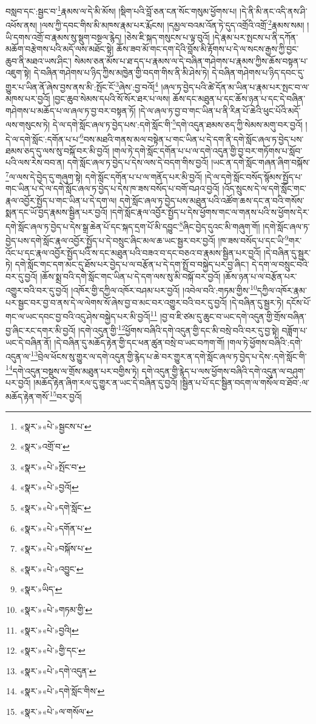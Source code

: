 བསླབ་དང་:སྦྱང་བ་\footnote{«སྣར་»«པེ་»སྦྱངས་པ་}རྣམས་ལ་དེ་མི་མོས། །སྡིག་པའི་བློ་ཅན་ངན་སོང་གསུམ་ཕྱོགས་པ། །དེ་ནི་མི་ནང་འདི་ནས་ཤི་འཕོས་ནས། །ལས་ཀྱི་དབང་གིས་མི་མཁས་རྣམ་པར་རྨོངས། །དམྱལ་བའམ་འོན་ཏེ་དུད་འགྲོའི་འགྲོ་\footnote{«སྣར་»འགྲོ་བ་}རྣམས་སམ། །ཡི་དགས་འགྲོ་བ་རྣམས་སུ་སྡུག་བསྔལ་རྙེད། །ཅེས་ཇི་སྐད་གསུངས་པ་ལྟ་བུའོ། །དེ་རྣམ་པར་སྤངས་པ་ནི་དཀོན་མཆོག་བརྩེགས་པའི་མདོ་ལས་མཐོང་སྟེ། ཆོས་ཟབ་མོ་གང་དག་དེའི་བློས་མི་རྟོགས་པ་དེ་ལ་སངས་རྒྱས་ཀྱི་བྱང་ཆུབ་ནི་མཐའ་ཡས་ཤིང་། སེམས་ཅན་མོས་པ་ཐ་དད་པ་རྣམས་ལ་དེ་བཞིན་གཤེགས་པ་རྣམས་ཀྱིས་ཆོས་བསྟན་པ་འཇུག་སྟེ། དེ་བཞིན་གཤེགས་པ་ཉིད་ཀྱིས་མཁྱེན་གྱི་བདག་གིས་ནི་མི་ཤེས་ཏེ། དེ་བཞིན་གཤེགས་པ་ཉིད་དབང་དུ་གྱུར་པ་ཡིན་ནོ་ཞེས་བྱས་ནས་མི་:སྤོང་ངོ་\footnote{«སྣར་»«པེ་»སྤོང་བ་}ཞེས་:བྱ་བའོ།\footnote{«སྣར་»«པེ་»བྱའོ།} །ཞལ་ཏ་བྱེད་པའི་ཚེ་དོན་མ་ཡིན་པ་རྣམ་པར་སྤང་བ་ལ་མཁས་པར་བྱའོ། །བྱང་ཆུབ་སེམས་དཔའི་སོ་སོར་ཐར་པ་ལས། ཆོས་དང་མཐུན་པ་དང་ཆོས་ཉན་པ་དང་དེ་བཞིན་གཤེགས་པ་མཆོད་པ་ལ་ཞལ་ཏ་བྱ་བར་བསྟན་ཏོ། །དེ་ལ་ཞལ་ཏ་བྱ་བ་གང་ཡིན་པ་ནི་རིན་པོ་ཆེའི་ཕུང་པོའི་མདོ་ལས་གསུངས་ཏེ། དེ་ལ་དགེ་སློང་ཞལ་ཏ་བྱེད་པས་:དགེ་སློང་གི་\footnote{«སྣར་»«པེ་»དགེ་སློང་}དགེ་འདུན་ཐམས་ཅད་ཀྱི་སེམས་མགུ་བར་བྱའོ། །དེ་ལ་དགེ་སློང་:དགོན་པ་པ་\footnote{«སྣར་»«པེ་»དགོན་པ་}བས་མཐའི་གནས་མལ་བསྟེན་པ་གང་ཡིན་པ་དེ་དག་ནི་དགེ་སློང་ཞལ་ཏ་བྱེད་པས་ཐམས་ཅད་དུ་ལས་སུ་བསྐོ་བར་མི་བྱའོ། །གལ་ཏེ་དགེ་སློང་དགོན་པ་པ་ལ་དགེ་འདུན་གྱི་བྱ་བར་གཏོགས་པ་སློབ་པའི་ལས་རེས་བབ་ན། དགེ་སློང་ཞལ་ཏ་བྱེད་པ་དེས་ལས་དེ་བདག་གིས་བྱའོ། །ཡང་ན་དགེ་སློང་གཞན་ཞིག་བསྐོས་\footnote{«སྣར་»«པེ་»བསྐོས་པ་}ལ་ལས་དེ་བྱེད་དུ་གཞུག་སྟེ། དགེ་སློང་དགོན་པ་པ་ལ་གནོད་པར་མི་བྱའོ། །དེ་ལ་དགེ་སློང་བསོད་སྙོམས་སྤྱོད་པ་གང་ཡིན་པ་དེ་ལ་དགེ་སློང་ཞལ་ཏ་བྱེད་པ་དེས་ཁ་ཟས་བསོད་པ་བགོ་བཤའ་བྱའོ། །འོད་སྲུངས་དེ་ལ་དགེ་སློང་གང་རྣལ་འབྱོར་སྤྱོད་པ་གང་ཡིན་པ་དེ་དག་ལ། དགེ་སློང་ཞལ་ཏ་བྱེད་པས་མཐུན་པའི་འཚོག་ཆས་དང་ན་བའི་གསོས་སྨན་དང་ཡོ་བྱད་རྣམས་སྦྱིན་པར་བྱའོ། །དགེ་སློང་རྣལ་འབྱོར་སྤྱོད་པ་དེས་ཕྱོགས་གང་ལ་གནས་པའི་ས་ཕྱོགས་དེར་དགེ་སློང་ཞལ་ཏ་བྱེད་པ་དེས་སྒྲ་ཆེན་པོ་དང་སྐད་དྲག་པོ་མི་དབྱུང་\footnote{«སྣར་»«པེ་»འབྱུང་}ཞིང་བྱེད་དུའང་མི་གཞུག་གོ། །དགེ་སློང་ཞལ་ཏ་བྱེད་པས་དགེ་སློང་རྣལ་འབྱོར་སྤྱོད་པ་དེ་བསྲུང་ཞིང་མལ་ཆ་ཡང་སྦྱར་བར་བྱའོ། །ཁ་ཟས་བསོད་པ་དང་ཡི་\footnote{«སྣར་»ཡིད་}གར་འོང་པ་དང་རྣལ་འབྱོར་སྤྱོད་པའི་ས་དང་མཐུན་པའི་བཟའ་བ་དང་བཅའ་བ་རྣམས་སྦྱིན་པར་བྱའོ། །དེ་བཞིན་དུ་སྦྱར་ཏེ། དགེ་སློང་གང་དག་མང་དུ་ཐོས་པར་བྱེད་པ་ལ་བརྩོན་པ་དེ་དག་སྤྲོ་བ་བསྐྱེད་པར་བྱ་ཞིང་། དེ་དག་ལ་བསྲུང་བའི་བར་དུ་བྱའོ། །ཆོས་སྨྲ་བའི་དགེ་སློང་གང་ཡིན་པ་དེ་དག་ལས་སུ་མི་བསྐོ་བར་བྱའོ། །ཆོས་ཉན་པ་ལ་བརྩོན་པར་འགྱུར་བའི་བར་དུ་བྱའོ། །འཁོར་གྱི་དཀྱིལ་འཁོར་བཤམ་པར་བྱའོ། །འབེལ་བའི་:གཏམ་གྱིས་\footnote{«སྣར་»«པེ་»གཏམ་གྱི་}དཀྱིལ་འཁོར་རྣམ་པར་སྦྱང་བར་བྱ་བ་ནས་དེ་ལ་ལེགས་སོ་ཞེས་བྱ་བ་མང་བར་འགྱུར་བའི་བར་དུ་བྱའོ། །དེ་བཞིན་དུ་སྦྱར་ཏེ། དངོས་པོ་གང་ལ་ཡང་དབང་བྱ་བའི་འདུ་ཤེས་བསྐྱེད་པར་མི་བྱའོ།\footnote{«སྣར་»«པེ་»བྱའི།} །བྱ་བ་ཇི་ཙམ་དུ་ཆུང་བ་ཡང་དགེ་འདུན་གྱི་གྲོས་བཞིན་བྱ་ཞིང་རང་དགར་མི་བྱའོ། །དགེ་འདུན་གྱི་\footnote{«སྣར་»«པེ་»གྱི་དང་}ཕྱོགས་བཞིའི་དགེ་འདུན་གྱི་དང་མི་བསྲེ་བའི་བར་དུ་བྱ་སྟེ། བཟློག་པ་ཡང་དེ་བཞིན་ནོ། །དེ་བཞིན་དུ་མཆོད་རྟེན་གྱི་དང་ཕན་ཚུན་བསྲེ་བ་ཡང་བཀག་གོ། །གལ་ཏེ་ཕྱོགས་བཞིའི་:དགེ་འདུན་ལ་\footnote{«སྣར་»«པེ་»དགེ་འདུན་}བྲེལ་ཕོངས་སུ་གྱུར་ལ་དགེ་འདུན་གྱི་རྙེད་པ་ཆེ་བར་གྱུར་ན་དགེ་སློང་ཞལ་ཏ་བྱེད་པ་དེས་:དགེ་སློང་གི་\footnote{«སྣར་»«པེ་»དགེ་སློང་གིས་}དགེ་འདུན་བསྡུས་ལ་གྲོས་མཐུན་པར་བགྱིས་ཏེ། དགེ་འདུན་གྱི་རྙེད་པ་ལས་ཕྱོགས་བཞིའི་དགེ་འདུན་ལ་བཤུག་པར་བྱའོ། །མཆོད་རྟེན་ཞིག་རལ་དུ་གྱུར་ན་ཡང་དེ་བཞིན་དུ་བྱའོ། །སྦྱིན་པ་པོ་དང་སྦྱིན་བདག་ལ་གསོལ་བ་ཐོབ་:ལ་མཆོད་རྟེན་གསོ་\footnote{«སྣར་»«པེ་»ལ་གསོལ་}བར་བྱའོ། 